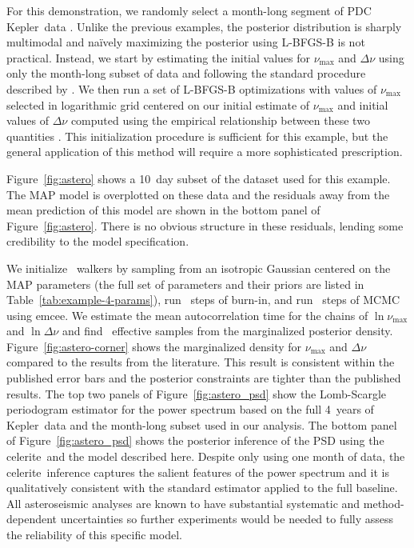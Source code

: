 \documentclass[manuscript, letterpaper]{aastex6}
\newcommand{\project}[1]{\textsf{#1}}
\newcommand{\kepler}{\project{Kepler}}
\newcommand{\celerite}{\project{celerite}}
\newcommand{\emcee}{\project{emcee}}
\newcommand{\figureref}[1]{\ref{fig:#1}}
\newcommand{\Figure}[1]{Figure~\figureref{#1}}
\newcommand{\response}[1]{{#1}}
\begin{document}
\response{For this demonstration, we randomly select a month-long segment of
    PDC \kepler\ data \citep{Stumpe:2012, Smith:2012}.
    Unlike the previous examples, the posterior distribution is sharply
    multimodal and na\"ively maximizing the posterior using \project{L-BFGS-B} is
    not practical.
    Instead, we start by estimating the initial values for $\nu_\mathrm{max}$ and
    $\Delta\nu$ using only the month-long subset of data and following the
    standard procedure described by \citet{Huber:2009}.
    We then run a set of \project{L-BFGS-B} optimizations with values of
    $\nu_\mathrm{max}$ selected in logarithmic grid centered on our initial
    estimate of $\nu_\mathrm{max}$ and initial values of $\Delta\nu$ computed
    using the empirical relationship between these two quantities
    \citep{Stello:2009}.
    This initialization procedure is sufficient for this example, but the general
    application of this method will require a more sophisticated prescription.

    \Figure{astero} shows a 10~day subset of the dataset used for this example.
    The MAP model is overplotted on these data and the residuals away from the
    mean prediction of this model are shown in the bottom panel of
    \Figure{astero}.
    There is no obvious structure in these residuals, lending some credibility to
    the model specification.

    We initialize \exampleivnwalkers~walkers by sampling from an isotropic
    Gaussian centered on the MAP parameters (the full set of parameters and their
    priors are listed in Table~\ref{tab:example-4-params}), run
    \exampleivnburn~steps of burn-in, and run \exampleivnsteps~steps of MCMC using
    \emcee.
    We estimate the mean autocorrelation time for the chains of
    $\ln\nu_\mathrm{max}$ and $\ln\Delta\nu$ and find \exampleivneff\ effective
    samples from the marginalized posterior density.
    \Figure{astero-corner} shows the marginalized density for $\nu_\mathrm{max}$
    and $\Delta\nu$ compared to the results from the literature.
    This result is consistent within the published error bars and the posterior
    constraints are tighter than the published results.
    The top two panels of \Figure{astero_psd} show the Lomb-Scargle periodogram
    \citep{VanderPlas:2017} estimator for the power spectrum based on the full
    4~years of \kepler\ data and the month-long subset used in our analysis.
    The bottom panel of \Figure{astero_psd} shows the posterior inference of the
    PSD using the \celerite\ and the model described here.
    Despite only using one month of data, the \celerite\ inference captures the
    salient features of the power spectrum and it is qualitatively consistent with
    the standard estimator applied to the full baseline.
    All asteroseismic analyses are known to have substantial systematic and
    method-dependent uncertainties \citep{Verner:2011} so further experiments
    would be needed to fully assess the reliability of this specific model.

}
\end{document}
